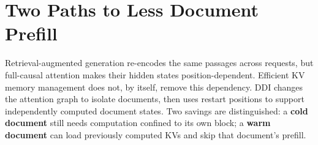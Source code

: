 \section{Two Paths to Less Document Prefill}
\label{sec:thesis}

Retrieval-augmented generation re-encodes the same passages across requests,
but full-causal attention makes their hidden states position-dependent.
Efficient KV memory management \citep{kwon2023pagedattention} does not, by
itself, remove this dependency. DDI changes the attention graph to isolate
documents, then uses restart positions to support independently computed
document states. Two savings are distinguished: a
\textcolor{ddiGold}{\textbf{cold document}} still needs computation confined
to its own block; a \textcolor{ddiGreen}{\textbf{warm document}} can load
previously computed KVs and skip that document's prefill.

